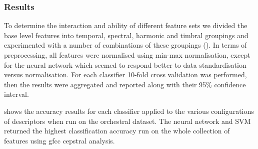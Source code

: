 {{{{{\subsubsection{Results}

To determine the interaction and ability of different feature sets  we divided the base level features into temporal, spectral, harmonic and timbral groupings and experimented with a number of combinations of these groupings ().  In terms of preprocessing, all features were normalised using min-max normalisation, except for the neural network which seemed to respond better to data standardisation versus normalisation. For each classifier 10-fold cross validation was performed, then the results were aggregated and reported along with their 95\% confidence interval.

 shows the accuracy results for each classifier applied to the various configurations of descriptors when run on the orchestral dataset. The neural network and SVM returned the highest classification accuracy run on the whole collection of features using \acrshort{gfcc} cepstral analysis.

}}}}}
